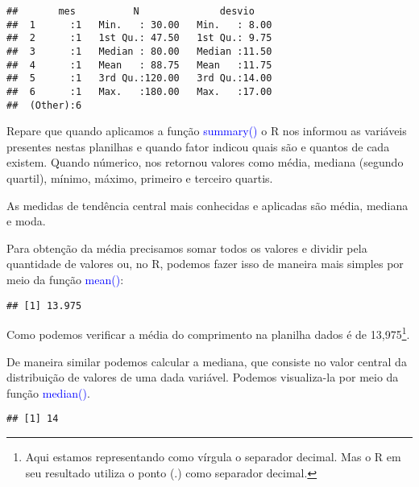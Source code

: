 \documentclass[14pt,titlepage, oneside, openany, a4paper]{book}
\newenvironment{Shaded}{\begin{snugshade}}{\end{snugshade}}
\newcommand{\KeywordTok}[1]{\textcolor[rgb]{0.13,0.29,0.53}{\textbf{#1}}}
\newcommand{\NormalTok}[1]{#1}
\newcommand{\OperatorTok}[1]{\textcolor[rgb]{0.81,0.36,0.00}{\textbf{#1}}}
\begin{document}
\begin{verbatim}
##       mes          N              desvio     
##  1      :1   Min.   : 30.00   Min.   : 8.00  
##  2      :1   1st Qu.: 47.50   1st Qu.: 9.75  
##  3      :1   Median : 80.00   Median :11.50  
##  4      :1   Mean   : 88.75   Mean   :11.75  
##  5      :1   3rd Qu.:120.00   3rd Qu.:14.00  
##  6      :1   Max.   :180.00   Max.   :17.00  
##  (Other):6
\end{verbatim}

Repare que quando aplicamos a função \textcolor{blue}{summary()} o R nos informou as variáveis presentes nestas planilhas e quando fator indicou quais são e quantos de cada existem. Quando númerico, nos retornou valores como média, mediana (segundo quartil), mínimo, máximo, primeiro e terceiro quartis.

As medidas de tendência central mais conhecidas e aplicadas são média, mediana e moda.

Para obtenção da média precisamos somar todos os valores e dividir pela quantidade de valores ou, no R, podemos fazer isso de maneira mais simples por meio da função \textcolor{blue}{mean()}:

\begin{Shaded}
\end{Shaded}

\begin{verbatim}
## [1] 13.975
\end{verbatim}

Como podemos verificar a média do comprimento na planilha dados é de 13,975\footnote{Aqui estamos representando como vírgula o separador decimal. Mas o R em seu resultado utiliza o ponto (.) como separador decimal.}.

De maneira similar podemos calcular a mediana, que consiste no valor central da distribuição de valores de uma dada variável. Podemos visualiza-la por meio da função \textcolor{blue}{median()}.

\begin{Shaded}
\end{Shaded}

\begin{verbatim}
## [1] 14
\end{verbatim}
\end{document}
